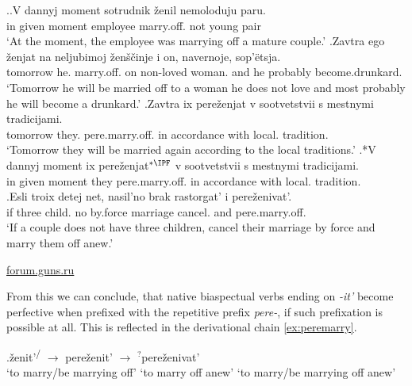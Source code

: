 \ex.\ag.\label{ex:peremarry1}V dannyj moment sotrudnik \v{z}enil\textsuperscript{\IPF} nemoloduju paru.\\
in given moment employee marry.off. {not young} pair\\
\trans `At the moment, the employee was marrying off a mature couple.'
\bg.\label{ex:peremarry2}Zavtra ego \v{z}enjat\textsuperscript{\PF} na neljubimoj \v{z}en\v{s}\v{c}inje i on, navernoje, sop'\"{e}tsja.\\
tomorrow he. marry.off. on non-loved woman. and he probably {become.drunkard.}\\
\trans `Tomorrow he will be married off to a woman he does not love and most probably he will become a drunkard.'
\bg.\label{ex:peremarry3}Zavtra ix pere\v{z}enjat\textsuperscript{\PF} v sootvetstvii s mestnymi tradicijami.\\
tomorrow they. pere.marry.off. in accordance with local. tradition.\\
\trans `Tomorrow they will be married again according to the local traditions.'
\bg.*V dannyj moment ix pere\v{z}enjat$^{*{\IPF}}$ v sootvetstvii s mestnymi tradicijami.\label{ex:peremarry4}\\
in given moment they pere.marry.off. in accordance with local. tradition.\\

\exg.\label{ex:perezenivat'}Esli troix detej net, nasil'no brak rastorgat' i pere\v{z}enivat'.\\
if three child. no by.force marriage cancel. and pere.marry.off.\\
\trans `If a couple does not have three children, cancel their marriage by force and marry them off anew.'
\begin{flushright}
\vspace{-0.5em}
\url{forum.guns.ru}
\end{flushright}

From this we can conclude, that native biaspectual verbs ending on \textit{-it'} become perfective when prefixed with the repetitive prefix \textit{pere-}, if such prefixation is possible at all. This is reflected in the derivational chain \ref{ex:peremarry}.

\exg.\label{ex:peremarry}\v{z}enit'\textsuperscript{\IPF\slash\PF} $\rightarrow$ pere\v{z}enit'\textsuperscript{\PF} $\rightarrow$ $^?$pere\v{z}enivat'\textsuperscript{\IPF} \\
{`to marry/be marrying off'} {} {`to marry off anew'} {} {`to marry/be marrying off anew'}\\

